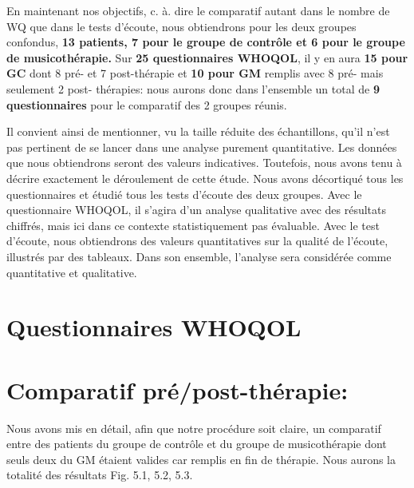      
     
      En maintenant nos objectifs, c. à. dire  le comparatif autant  dans le nombre de WQ que dans le  tests 
      d'écoute, 
     nous obtiendrons pour  les deux groupes confondus, \textbf{13 patients, 7 pour le groupe de contrôle 
     et 
     	6 pour 
     	le groupe de musicothérapie.}
     Sur \textbf{25 questionnaires WHOQOL}, il y en aura  \textbf{15 pour GC} dont 8 pré-
     et 7 post-thérapie et  \textbf{10 pour GM} remplis
     avec 8  pré- mais seulement 2
     post- thérapies:  nous aurons donc dans l'ensemble un total de \textbf{9 questionnaires} pour le
     comparatif des 2 groupes réunis.
   
   
   
   Il convient ainsi de mentionner, vu la taille réduite des échantillons, qu'il n'est pas
   pertinent de se lancer dans une analyse purement
   quantitative.
   Les données que nous obtiendrons seront des valeurs indicatives.
   Toutefois, nous avons tenu à décrire exactement le déroulement de cette étude. Nous avons 
   décortiqué 
   tous les questionnaires et étudié tous les tests d'écoute des deux groupes.
   Avec le questionnaire 
   WHOQOL,  il  s'agira d'un analyse qualitative avec des résultats chiffrés, mais ici dans ce contexte
   statistiquement pas évaluable. 
   Avec le test d'écoute, nous obtiendrons des valeurs quantitatives sur la qualité de l'écoute, illustrés 
   par 
   des tableaux.
   Dans son ensemble, l'analyse sera considérée comme quantitative  et qualitative.
   
   
   
   \section{Questionnaires WHOQOL  }
   \section*{Comparatif pré/post-thérapie:}
   Nous avons mis en détail, afin que notre procédure soit claire, un comparatif entre des patients du 
   groupe de contrôle et du groupe de 
   musicothérapie dont  seuls deux du GM étaient valides car remplis en fin de thérapie. Nous aurons la 
   totalité des 
   résultats Fig. 5.1, 5.2, 5.3.
